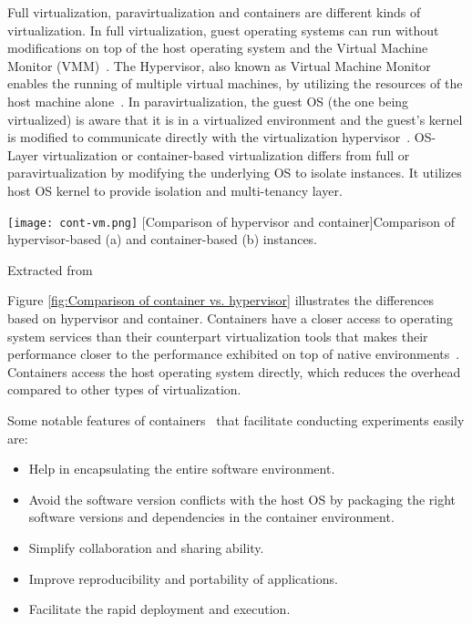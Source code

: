 Full virtualization, paravirtualization and containers are different 
kinds of virtualization. In full virtualization, guest operating 
systems can run without modifications on top of the host operating 
system and the Virtual Machine Monitor (VMM)~\cite{7382987}. 
The Hypervisor, also known as Virtual Machine Monitor enables the running of multiple
virtual machines, by utilizing the resources of the host machine alone~\cite{hypervisor}. In paravirtualization, 
the guest OS (the one being virtualized) is aware that it is in a 
virtualized environment and the guest's kernel is modified to 
communicate directly with the virtualization hypervisor~\cite{7382987}. 
OS-Layer virtualization or container-based virtualization differs from 
full or paravirtualization by modifying the underlying OS to isolate 
instances. It utilizes host OS kernel to provide isolation and 
multi-tenancy layer.
\begin{center}
\texttt{[image: cont-vm.png]}
  [Comparison of hypervisor and container]{Comparison of hypervisor-based (a) and container-based (b) instances.}
\label{fig:Comparison of container vs. hypervisor}
\caption*{Extracted from \cite{7382987}}
\end{center}

Figure \ref{fig:Comparison of container vs. hypervisor} illustrates the differences based on hypervisor and container. Containers have a closer access to operating system services than their counterpart virtualization tools that makes their performance closer to the performance exhibited on top of native environments~\cite{Xavier:2013:PEC:2497369.2497577}. Containers access the host operating system directly, which reduces the overhead compared to other types of virtualization.

Some notable features of containers~\cite{docker-run,DBLP:journals/corr/HaleLRW16,Julian:2016:CRI:2949550.2949562,10.1109/ISPASS.2015.7095802} that facilitate conducting experiments easily are:

\begin{itemize}
  \item Help in encapsulating the entire software environment.
  \item Avoid the software version conflicts with the host OS by packaging the right software versions and dependencies in the container environment.
  \item Simplify collaboration and sharing ability.
  \item Improve reproducibility and portability of applications.
  \item Facilitate the rapid deployment and execution.
\end{itemize}

